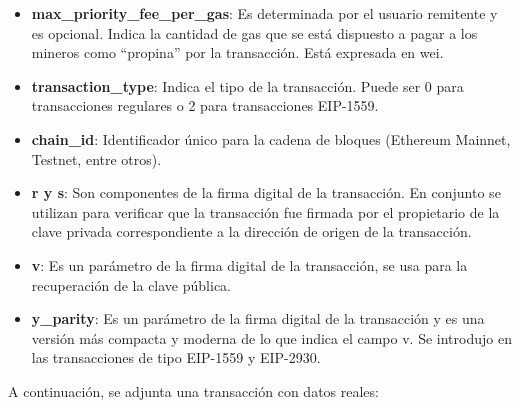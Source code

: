 \documentclass{article}
\begin{document}
\begin{itemize}
    \item \textbf{max\_priority\_fee\_per\_gas}: Es determinada por el usuario remitente y es opcional. Indica la cantidad de gas que se está dispuesto a pagar a los mineros como “propina” por la transacción. Está expresada en wei.
    \item \textbf{transaction\_type}: Indica el tipo de la transacción. Puede ser 0 para transacciones regulares o 2 para transacciones EIP-1559.
    \item \textbf{chain\_id}: Identificador único para la cadena de bloques (Ethereum Mainnet, Testnet, entre otros). 
    \item \textbf{r y s}: Son componentes de la firma digital de la transacción. En conjunto se utilizan para verificar que la transacción fue firmada por el propietario de la clave privada correspondiente a la dirección de origen de la transacción.
    \item \textbf{v}: Es un parámetro de la firma digital de la transacción, se usa para la recuperación de la clave pública. 
    \item \textbf{y\_parity}: Es un parámetro de la firma digital de la transacción y es una versión más compacta y moderna de lo que indica el campo v. Se introdujo en las transacciones de tipo EIP-1559 y EIP-2930.
\end{itemize}
A continuación, se adjunta una transacción con datos reales:
\end{document}
